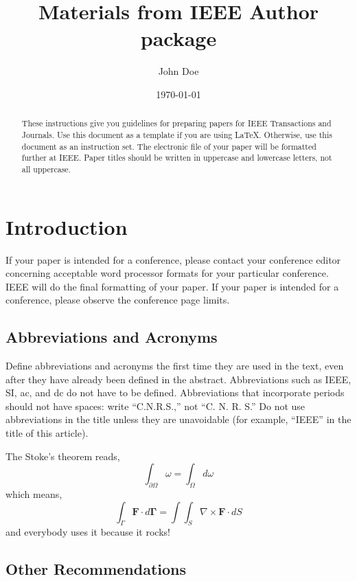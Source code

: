 \documentclass[11pt]{article}
\author{John Doe}
\date{\today}
\title{Materials from IEEE Author package}
\begin{document}
\maketitle

\begin{abstract}
These instructions give you guidelines for preparing papers for
IEEE Transactions and Journals. Use this document as a template if you are
using \LaTeX. Otherwise, use this document as an
instruction set. The electronic file of your paper will be formatted further
at IEEE. Paper titles should be written in uppercase and lowercase letters,
not all uppercase.
\end{abstract}


\section{Introduction}
\label{sec:introduction}

If your paper is intended for a conference, please contact your
conference editor concerning acceptable word processor formats for your
particular conference. IEEE will do the final formatting of your
paper. If your paper is intended for a conference, please observe the
conference page limits.


\subsection{Abbreviations and Acronyms}
\label{sec:abrev}

Define abbreviations and acronyms the first time they are used in the text,
even after they have already been defined in the abstract. Abbreviations
such as IEEE, SI, ac, and dc do not have to be defined. Abbreviations that
incorporate periods should not have spaces: write ``C.N.R.S.,'' not ``C. N.
R. S.'' Do not use abbreviations in the title unless they are unavoidable
(for example, ``IEEE'' in the title of this article).

The Stoke's theorem reads,
\begin{equation}
  \label{eq:beautiful}
  \int_{\partial\Omega} \omega = \int_\Omega d\omega
\end{equation}
which means,
\begin{equation}
  \label{sec:ugly}
  \int_\Gamma \mathbf{F}\cdot d\mathbf{\Gamma}
  =
  \int\int_S \nabla\times\mathbf{F}\cdot dS
\end{equation}
and everybody uses it because it rocks!


\subsection{Other Recommendations}
\label{sec:reco}
\end{document}

